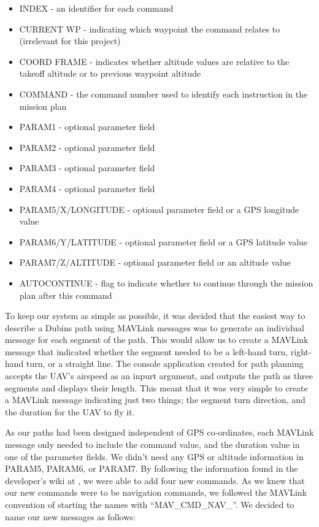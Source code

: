 \begin{itemize}
	\item INDEX - an identifier for each command
	\item CURRENT WP - indicating which waypoint the command relates to (irrelevant for this project)
	\item COORD FRAME - indicates whether altitude values are relative to the takeoff altitude or to previous waypoint altitude
	\item COMMAND - the command number used to identify each instruction in the mission plan
	\item PARAM1 - optional parameter field
	\item PARAM2 - optional parameter field
	\item PARAM3 - optional parameter field
	\item PARAM4 - optional parameter field
	\item PARAM5/X/LONGITUDE - optional parameter field or a GPS longitude value 
	\item PARAM6/Y/LATITUDE - optional parameter field or a GPS latitude value
	\item PARAM7/Z/ALTITUDE - optional parameter field or an altitude value
	\item AUTOCONTINUE - flag to indicate whether to continue through the mission plan after this command
\end{itemize}

 To keep our system as simple as possible, it was decided that the easiest way to describe a Dubins path using MAVLink messages was to generate an individual message for each segment of the path. This would allow us to create a MAVLink message that indicated whether the segment needed to be a left-hand turn, right-hand turn, or a straight line. The console application created for path planning accepts the UAV's airspeed as an inpurt argument, and outputs the path as three segments and displays their length. This meant that it was very simple to create a MAVLink message indicating just two things; the segment turn direction, and the duration for the UAV to fly it. 

 As our paths had been designed independent of GPS co-ordinates, each MAVLink message only needed to include the command value, and the duration value in one of the parameter fields. We didn't need any GPS or altitude information in PARAM5, PARAM6, or PARAM7. By following the information found in the developer's wiki at \cite{ArduPilotMAVLink}, we were able to add four new commands. As we knew that our new commands were to be navigation commands, we followed the MAVLink convention of starting the names with ``MAV\_CMD\_NAV\_''. We decided to name our new messages as follows:

